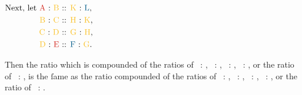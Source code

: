 \documentclass[12pt,preview]{standalone}
\begin{document}
\newpage

\begin{minipage}{\textwidth}
    \begin{center}
        $\begin{aligned}\text{Next, let \redA\ : \yellowB\ } & \text{:: \yellowK\ : \blueL},   \\
               \text{\yellowB\ : \yellowC\ }        & \text{:: \yellowH\ : \yellowK}, \\
               \text{\yellowC\ : \yellowD\ }        & \text{:: \yellowG\ : \yellowH}, \\
               \text{\yellowD\ : \redE\ }           & \text{:: \blueF\ : \yellowG}.   \\
            \end{aligned}$
    \end{center}

    \hfill

    Then the ratio which is compounded of the ratios of \redA\ : \yellowB, \yellowB\ : \yellowC, \yellowC\ : \yellowD, \yellowD\ : \redE, or the ratio of \redA\ : \redE, is the ſame as the ratio compounded of the ratios of \yellowK\ : \blueL, \yellowH\ : \yellowK, \yellowG\ : \yellowH, \blueF\ : \yellowG, or the ratio of \blueF\ : \blueL.

    \hfill


\end{minipage}
\end{document}
